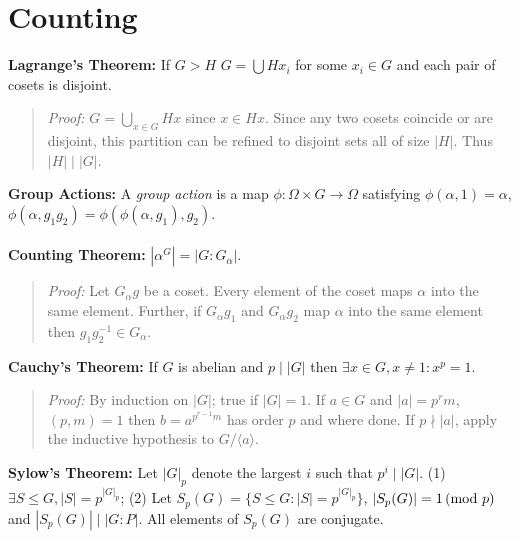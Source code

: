 \section {Counting}
{\bf Lagrange's Theorem:} If $G>H$ $G= \bigcup Hx_i$ for some $x_i \in G$ and each pair of
cosets is disjoint.
\begin{quote}
\emph{Proof:}  $G= \bigcup_{x \in G} Hx$ since $x \in Hx$.  Since any
two cosets coincide or are disjoint, this partition can be refined to disjoint sets all of
size $|H|$.   Thus $|H| \mid |G|$.
\end{quote}
{\bf Group Actions:} A \emph{group action} is a map $\phi: \Omega \times G \rightarrow \Omega$
satisfying $\phi(\alpha,1)= \alpha$, $\phi(\alpha, g_1 g_2)= \phi(\phi(\alpha, g_1), g_2)$.
\\
\\
{\bf Counting Theorem:} $|\alpha^G|= |G:G_{\alpha}|$.
\begin{quote}
\emph{Proof:} Let $G_{\alpha} g$ be a coset.  Every element of the coset maps $\alpha$ into the same element.  Further,
if $G_{\alpha} g_1$ and
$G_{\alpha} g_2$ map $\alpha$ into the same element then
$g_1 g_2^{-1} \in G_{\alpha}$.
\end{quote}
{\bf Cauchy's Theorem:}  If $G$ is abelian and $p \mid |G|$ then $\exists x \in G, x \ne 1: x^p=1$.
\begin{quote}
\emph{Proof:}  By induction on $|G|$; true if $|G|=1$.
If $a \in G$ and $|a|= p^rm$, $(p, m)=1$ then $b=a^{p^{r-1}m}$ has order $p$ and where done.
If $p \nmid |a|$, apply the inductive hypothesis to $G/ \langle a \rangle$.
\end{quote}
{\bf Sylow's Theorem:}  Let $|G|_p$ denote the largest $i$ such that $p^i \mid |G|$.
(1) $\exists S \le G, |S|= p^{|G|_p}$; (2) Let $S_p(G)= \{S \le G: |S|= p^{|G|_p} \}$,
$|S_p(G)| = 1 \thinspace \textnormal{(mod } p \textnormal{)}$ and $|S_p(G)| \mid |G:P|$.  All elements of $S_p(G)$ are conjugate.
